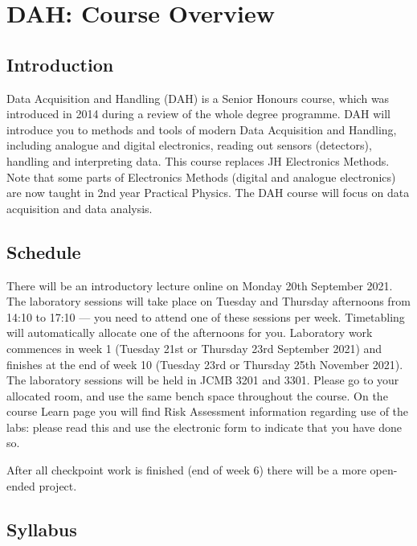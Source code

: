 \chapter{DAH: Course Overview}
\label{sec:overview}

\section{Introduction}

Data Acquisition and Handling (DAH) is a Senior Honours course, which was introduced in 2014 during a review of the whole degree programme.
DAH will introduce you to methods and tools of modern Data Acquisition and Handling, including analogue and digital electronics, reading out sensors (detectors), handling and interpreting data.
This course replaces JH Electronics Methods.
Note that some parts of Electronics Methods (digital and analogue electronics) are now taught in 2nd year Practical Physics.
The DAH course will focus on data acquisition and data analysis.

\section{Schedule}

There will be an introductory lecture online on Monday 20th September 2021.
The laboratory sessions will take place on Tuesday and Thursday afternoons from 14:10 to 17:10 --- you need to attend one of these sessions per week.
Timetabling will automatically allocate one of the afternoons for you.
Laboratory work commences in week 1 (Tuesday 21st or Thursday 23rd September 2021) and finishes at the end of week 10 (Tuesday 23rd or Thursday 25th November 2021).
The laboratory sessions will be held in JCMB 3201 and 3301.
Please go to your allocated room, and use the same bench space throughout the course.
On the course Learn page you will find Risk Assessment information regarding use of the labs: please read this and use the electronic form to indicate that you have done so.

After all checkpoint work is finished (end of week 6) there will be a more open-ended project.

\newpage
\section{Syllabus}

